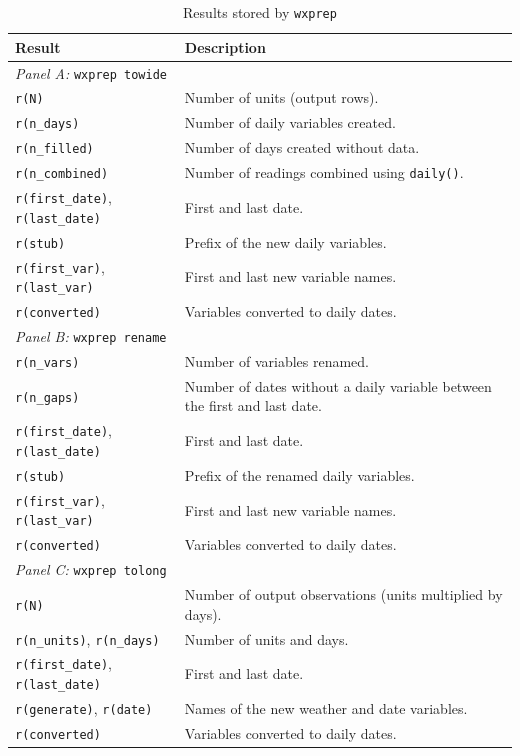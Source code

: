 \begin{table}[htbp]
	\caption{Results stored by \texttt{wxprep}}
	\label{tab:wxprepresults}
	\label{tab:wxpreptowideresults}
	\label{tab:wxpreprenameresults}
	\label{tab:wxpreptolongresults}
	\begin{center}
		\begin{tabularx}{\textwidth}{l>{\raggedright\arraybackslash}X}
			\hline
			Result & Description \\
			\hline
			\multicolumn{2}{l}{\textit{Panel A:} \texttt{wxprep towide}} \\[3pt]
			\texttt{r(N)} & Number of units (output rows). \\
			\texttt{r(n\_days)} & Number of daily variables created. \\
			\texttt{r(n\_filled)} & Number of days created without data. \\
			\texttt{r(n\_combined)} & Number of readings combined using \texttt{daily()}. \\
			\texttt{r(first\_date)}, \texttt{r(last\_date)} & First and last date. \\
			\texttt{r(stub)} & Prefix of the new daily variables. \\
			\texttt{r(first\_var)}, \texttt{r(last\_var)} & First and last new variable names. \\
			\texttt{r(converted)} & Variables converted to daily dates. \\[6pt]
			\multicolumn{2}{l}{\textit{Panel B:} \texttt{wxprep rename}} \\[3pt]
			\texttt{r(n\_vars)} & Number of variables renamed. \\
			\texttt{r(n\_gaps)} & Number of dates without a daily variable between the first and last date. \\
			\texttt{r(first\_date)}, \texttt{r(last\_date)} & First and last date. \\
			\texttt{r(stub)} & Prefix of the renamed daily variables. \\
			\texttt{r(first\_var)}, \texttt{r(last\_var)} & First and last new variable names. \\
			\texttt{r(converted)} & Variables converted to daily dates. \\[6pt]
			\multicolumn{2}{l}{\textit{Panel C:} \texttt{wxprep tolong}} \\[3pt]
			\texttt{r(N)} & Number of output observations (units multiplied by days). \\
			\texttt{r(n\_units)}, \texttt{r(n\_days)} & Number of units and days. \\
			\texttt{r(first\_date)}, \texttt{r(last\_date)} & First and last date. \\
			\texttt{r(generate)}, \texttt{r(date)} & Names of the new weather and date variables. \\
			\texttt{r(converted)} & Variables converted to daily dates. \\
			\hline
		\end{tabularx}
	\end{center}
\end{table}

